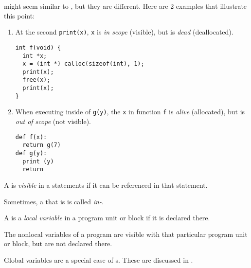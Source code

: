  might seem similar to , but they are different.
Here are 2 examples that illustrate this point:
\begin{enumerate}[noitemsep]
\item At the second \texttt{print(x)}, \texttt{x} is \emph{in scope} (visible), but is \emph{dead} (deallocated).
\begin{verbatim}
int f(void) {
  int *x;
  x = (int *) calloc(sizeof(int), 1);
  print(x);
  free(x);
  print(x);
}
\end{verbatim}
  
\item When executing inside of \texttt{g(y)}, the \texttt{x} in function \texttt{f} is \emph{alive} (allocated), but is \emph{out of scope} (not visible).
\begin{verbatim}
def f(x):
  return g(7)
def g(y):
  print (y)
  return
\end{verbatim}
\end{enumerate}

\begin{definition}[Visible]\label{def:Visible_Variable}
  A  is \emph{visible} in a statements if it can be referenced in that statement.

  \begin{remark}[In-Scope]\label{rmk:In_Scope_Variable}
    Sometimes, a  that is  is called \emph{in-}.
  \end{remark}
\end{definition}

\begin{definition}\label{def:Local_Variable}
  A  is a \emph{local variable} in a program unit or block if it is declared there.
\end{definition}

\begin{definition}\label{def:Nonlocal_Variable}
  The nonlocal variables of a program are visible with that particular program unit or block, but are not declared there.

  \begin{remark}
    Global variables are a special case of s.
    These are discussed in .
  \end{remark}
\end{definition}


